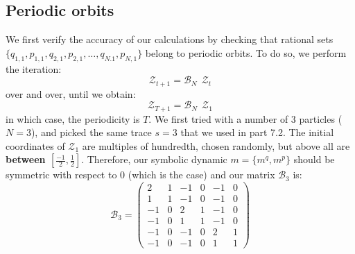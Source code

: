 \subsection{Periodic orbits}

We first verify the accuracy of our calculations by checking that rational sets $\{q_{1,1}, p_{1,1}, q_{2,1}, p_{2,1}, \dots, q_{N.1}, p_{N,1} \}$ belong to periodic orbits. To do so, we perform the iteration:
\[
\mathcal{Z}_{t+1} = \mathcal{B}_N \: \ \mathcal{Z}_{t}
\]
over and over, until we obtain:
\[
\mathcal{Z}_{T+1} = \mathcal{B}_N \: \ \mathcal{Z}_1
\]
in which case, the periodicity is $T$. We first tried with a number of 3 particles ($N=3$), and picked the same trace $s = 3$ that we used in part 7.2. The initial coordinates of $\mathcal{Z}_1$ are multiples of hundredth, chosen randomly, but above all are \textbf{between $[\frac{-1}{2}, \frac{1}{2}]$}. Therefore, our symbolic dynamic $m = \{m^q, m^p\}$ should be symmetric with respect to 0 (which is the case) and our matrix $\mathcal{B}_3$ is:
\[
\mathcal{B}_3 = \left(\begin{array}{cccccc} 2 & 1 & -1 & 0 & -1 & 0\\ 1 & 1 & -1 & 0 & -1 & 0\\ -1 & 0 & 2 & 1 & -1 & 0\\ -1 & 0 & 1 & 1 & -1 & 0\\ -1 & 0 & -1 & 0 & 2 & 1\\ -1 & 0 & -1 & 0 & 1 & 1 \end{array}\right)
\]

